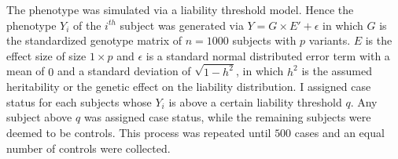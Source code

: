 The phenotype was simulated via a liability threshold model.
Hence the phenotype $Y_i$ of the $i^{th}$ subject was generated via
$Y = G\times E' + \epsilon$
in which $G$ is the standardized genotype matrix of $n=1000$ subjects with $p$ variants.
$E$ is the effect size of size $1\times p$ and $\epsilon$ is a standard normal distributed error term with a mean of $0$ and a standard deviation of $\sqrt{1-h^2}$, in which $h^2$ is the assumed heritability or the genetic effect on the liability distribution.
I assigned case status for each subjects whose $Y_i$ is above a certain liability threshold $q$.
Any subject above $q$ was assigned case status, while the remaining subjects were deemed to be controls.
This process was repeated until $500$ cases and an equal number of controls were collected.
